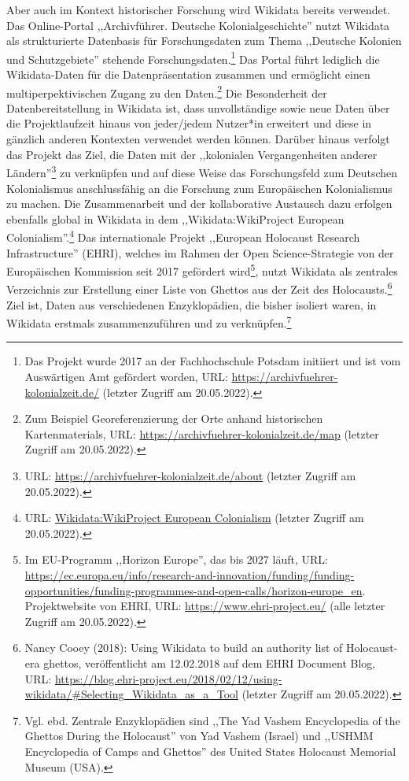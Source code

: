 Aber auch im Kontext historischer Forschung wird Wikidata bereits verwendet. Das Online-Portal ,,Archivführer. Deutsche Kolonialgeschichte'' nutzt Wikidata als strukturierte Datenbasis für Forschungsdaten zum Thema ,,Deutsche Kolonien und Schutzgebiete'' stehende Forschungsdaten.\footnote{Das Projekt wurde 2017 an der Fachhochschule Potsdam initiiert und ist vom Auswärtigen Amt gefördert worden, URL: \url{https://archivfuehrer-kolonialzeit.de/} (letzter Zugriff am 20.05.2022).} Das Portal führt lediglich die Wikidata-Daten für die Datenpräsentation zusammen und ermöglicht einen multiperpektivischen Zugang zu den Daten.\footnote{Zum Beispiel Georeferenzierung der Orte anhand historischen Kartenmaterials, URL: \url{https://archivfuehrer-kolonialzeit.de/map} (letzter Zugriff am 20.05.2022).} Die Besonderheit der Datenbereitstellung in Wikidata ist, dass unvollständige sowie neue Daten über die Projektlaufzeit hinaus von jeder/jedem Nutzer*in erweitert und diese in gänzlich anderen Kontexten verwendet werden können. Darüber hinaus verfolgt das Projekt das Ziel, die Daten mit der ,,kolonialen Vergangenheiten anderer Ländern''\footnote{URL: \url{https://archivfuehrer-kolonialzeit.de/about} (letzter Zugriff am 20.05.2022).} zu verknüpfen und auf diese Weise das Forschungsfeld zum Deutschen Kolonialismus anschlussfähig an die Forschung zum Europäischen Kolonialismus zu machen. Die Zusammenarbeit und der kollaborative Austausch dazu erfolgen ebenfalls global in Wikidata in dem ,,Wikidata:WikiProject European Colonialism''.\footnote{URL: \url{Wikidata:WikiProject European Colonialism} (letzter Zugriff am 20.05.2022).} Das internationale Projekt ,,European Holocaust Research Infrastructure'' (EHRI), welches im Rahmen der Open Science-Strategie von der Europäischen Kommission seit 2017 gefördert wird\footnote{Im EU-Programm ,,Horizon Europe'', das bis 2027 läuft, URL: \url{https://ec.europa.eu/info/research-and-innovation/funding/funding-opportunities/funding-programmes-and-open-calls/horizon-europe_en}. Projektwebsite von EHRI, URL: \url{https://www.ehri-project.eu/} (alle letzter Zugriff am 20.05.2022).}, nutzt Wikidata als zentrales Verzeichnis zur Erstellung einer Liste von Ghettos aus der Zeit des Holocausts.\footnote{Nancy Cooey (2018): Using Wikidata to build an authority list of Holocaust-era ghettos, veröffentlicht am 12.02.2018 auf dem EHRI Document Blog, URL: \url{https://blog.ehri-project.eu/2018/02/12/using-wikidata/\#Selecting\_Wikidata\_as\_a\_Tool} (letzter Zugriff am 20.05.2022).} Ziel ist, Daten aus verschiedenen Enzyklopädien, die bisher isoliert waren, in Wikidata erstmals zusammenzuführen und zu verknüpfen.\footnote{Vgl. ebd. Zentrale Enzyklopädien sind ,,The Yad Vashem Encyclopedia of the Ghettos During the Holocaust'' von Yad Vashem (Israel) und ,,USHMM Encyclopedia of Camps and Ghettos'' des United States Holocaust Memorial Museum (USA).} 

